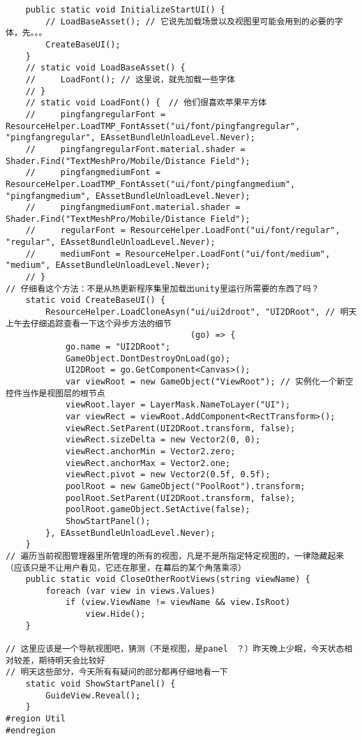 \documentclass[9pt, b5paper]{article}
\begin{document}
\begin{verbatim}
    public static void InitializeStartUI() {
        // LoadBaseAsset(); // 它说先加载场景以及视图里可能会用到的必要的字体，先。。。
        CreateBaseUI();
    }
    // static void LoadBaseAsset() {
    //     LoadFont(); // 这里说，就先加载一些字体
    // }
    // static void LoadFont() {　// 他们很喜欢苹果平方体
    //     pingfangregularFont = ResourceHelper.LoadTMP_FontAsset("ui/font/pingfangregular", "pingfangregular", EAssetBundleUnloadLevel.Never);
    //     pingfangregularFont.material.shader = Shader.Find("TextMeshPro/Mobile/Distance Field");
    //     pingfangmediumFont = ResourceHelper.LoadTMP_FontAsset("ui/font/pingfangmedium", "pingfangmedium", EAssetBundleUnloadLevel.Never);
    //     pingfangmediumFont.material.shader = Shader.Find("TextMeshPro/Mobile/Distance Field");
    //     regularFont = ResourceHelper.LoadFont("ui/font/regular", "regular", EAssetBundleUnloadLevel.Never);
    //     mediumFont = ResourceHelper.LoadFont("ui/font/medium", "medium", EAssetBundleUnloadLevel.Never);
    // }
// 仔细看这个方法：不是从热更新程序集里加载出unity里运行所需要的东西了吗？    
    static void CreateBaseUI() {
        ResourceHelper.LoadCloneAsyn("ui/ui2droot", "UI2DRoot", // 明天上午去仔细追踪查看一下这个异步方法的细节
                                     (go) => {
            go.name = "UI2DRoot";
            GameObject.DontDestroyOnLoad(go);
            UI2DRoot = go.GetComponent<Canvas>();
            var viewRoot = new GameObject("ViewRoot"); // 实例化一个新空控件当作是视图层的根节点
            viewRoot.layer = LayerMask.NameToLayer("UI");　
            var viewRect = viewRoot.AddComponent<RectTransform>();
            viewRect.SetParent(UI2DRoot.transform, false);
            viewRect.sizeDelta = new Vector2(0, 0);
            viewRect.anchorMin = Vector2.zero;
            viewRect.anchorMax = Vector2.one;
            viewRect.pivot = new Vector2(0.5f, 0.5f);
            poolRoot = new GameObject("PoolRoot").transform;
            poolRoot.SetParent(UI2DRoot.transform, false);
            poolRoot.gameObject.SetActive(false);
            ShowStartPanel();
        }, EAssetBundleUnloadLevel.Never);
    }
// 遍历当前视图管理器里所管理的所有的视图，凡是不是所指定特定视图的，一律隐藏起来（应该只是不让用户看见，它还在那里，在幕后的某个角落乘凉）
    public static void CloseOtherRootViews(string viewName) {
        foreach (var view in views.Values) 
            if (view.ViewName != viewName && view.IsRoot) 
                view.Hide();
    }
    
// 这里应该是一个导航视图吧，猜测（不是视图，是panel　？）昨天晚上少眠，今天状态相对较差，期待明天会比较好
// 明天这些部分，今天所有有疑问的部分都再仔细地看一下    
    static void ShowStartPanel() {
        GuideView.Reveal();
    }
#region Util
#endregion


\end{verbatim}
\end{document}
